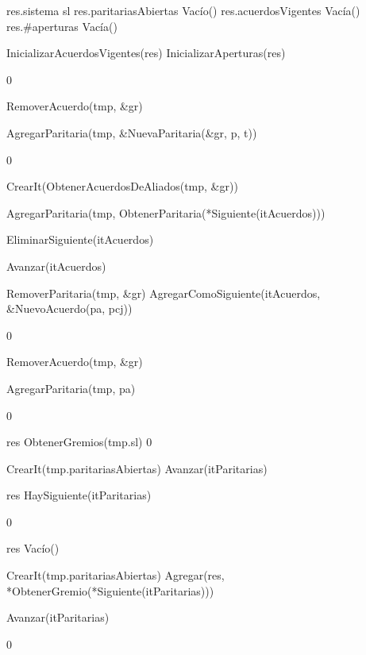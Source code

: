 {
	\state res.sistema \asig sl
	\state res.paritariasAbiertas \asig Vacío()
	\state res.acuerdosVigentes \asig Vacía()
	\state res.\#aperturas \asig Vacía()
	\state

	\state InicializarAcuerdosVigentes(res)
	\state InicializarAperturas(res)
}
{0}

{
		\state RemoverAcuerdo(tmp, \&gr)
	\endif
	\state

	\state AgregarParitaria(tmp, \&NuevaParitaria(\&gr, p, t))
}
{0}

{

	\state {} \asig CrearIt(ObtenerAcuerdosDeAliados(tmp, \&gr))
		\state

		\state AgregarParitaria(tmp, ObtenerParitaria(*Siguiente(itAcuerdos)))

		\state EliminarSiguiente(itAcuerdos)

		\state
		\state Avanzar(itAcuerdos)
	\endwhile
	\state

	\state {} \asig RemoverParitaria(tmp, \&gr)
	\state AgregarComoSiguiente(itAcuerdos, \&NuevoAcuerdo(pa, pcj))
}
{0}

{
	\state {} \asig RemoverAcuerdo(tmp, \&gr)

	\state AgregarParitaria(tmp, pa)
}
{0}

{
	\state res \asig ObtenerGremios(tmp.sl)
}
{0}

{
	\state {} \asig CrearIt(tmp.paritariasAbiertas)
		\state
		\state Avanzar(itParitarias)
	\endwhile
	\state

	\state res \asig HaySiguiente(itParitarias)
}
{0}

{
	\state res \asig Vacío()
	\state

	\state {} \asig CrearIt(tmp.paritariasAbiertas)
		\state
		\state Agregar(res, *ObtenerGremio(*Siguiente(itParitarias)))
		
		\state
		\state Avanzar(itParitarias)
	\endwhile
}
{0}


